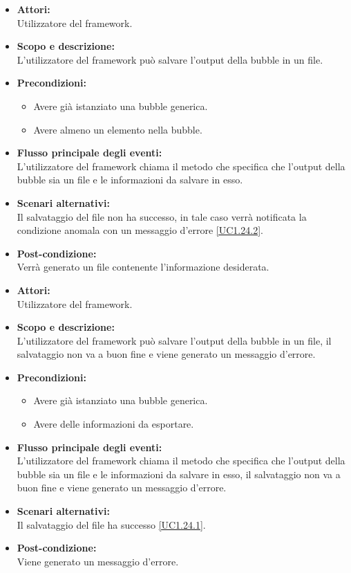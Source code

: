 \begin{itemize}
	\item \textbf{Attori:}
	\\Utilizzatore del framework.
	\item \textbf{Scopo e descrizione:} 
	\\L'utilizzatore del framework può salvare l'output della bubble in un file.
	\item \textbf{Precondizioni:}
	\begin{itemize}
		\item Avere già istanziato una bubble generica.
		\item Avere almeno un elemento nella bubble.
	\end{itemize}
	\item \textbf{Flusso principale degli eventi:}
	\\L'utilizzatore del framework chiama il metodo che specifica che l'output della bubble sia un file e le informazioni da salvare in esso.
	\item \textbf{Scenari alternativi:}
	\\Il salvataggio del file non ha successo, in tale caso verrà notificata la condizione anomala con un messaggio d'errore \ref{UC1.24.2}.
	\item \textbf{Post-condizione:}
	\\Verrà generato un file contenente l'informazione desiderata.
\end{itemize}


\begin{itemize}
	\item \textbf{Attori:}
	\\Utilizzatore del framework.
	\item \textbf{Scopo e descrizione:} 
	\\L'utilizzatore del framework può salvare l'output della bubble in un file, il salvataggio non va a buon fine e viene generato un messaggio d'errore.
	\item \textbf{Precondizioni:}
	\begin{itemize}
		\item Avere già istanziato una bubble generica.
		\item Avere delle informazioni da esportare.
	\end{itemize}
	\item \textbf{Flusso principale degli eventi:}
	\\L'utilizzatore del framework chiama il metodo che specifica che l'output della bubble sia un file e le informazioni da salvare in esso, il salvataggio non va a buon fine e viene generato un messaggio d'errore.
	\item \textbf{Scenari alternativi:}
	\\Il salvataggio del file ha successo \ref{UC1.24.1}.
	\item \textbf{Post-condizione:}
	\\Viene generato un messaggio d'errore.
\end{itemize}

